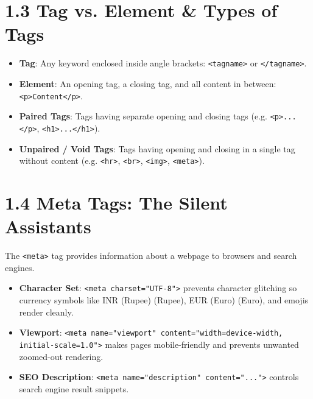 \section{1.3 Tag vs. Element \& Types of Tags}
\begin{itemize}[leftmargin=*]
    \item \textbf{Tag}: Any keyword enclosed inside angle brackets: \texttt{<tagname>} or \texttt{</tagname>}.
    \item \textbf{Element}: An opening tag, a closing tag, and all content in between: \texttt{<p>Content</p>}.
    \item \textbf{Paired Tags}: Tags having separate opening and closing tags (e.g. \texttt{<p>...</p>}, \texttt{<h1>...</h1>}).
    \item \textbf{Unpaired / Void Tags}: Tags having opening and closing in a single tag without content (e.g. \texttt{<hr>}, \texttt{<br>}, \texttt{<img>}, \texttt{<meta>}).
\end{itemize}

\section{1.4 Meta Tags: The Silent Assistants}
\begin{summarybox}
The \texttt{<meta>} tag provides information about a webpage to browsers and search engines.
\begin{itemize}[leftmargin=*]
    \item \textbf{Character Set}: \texttt{<meta charset="UTF-8">} prevents character glitching so currency symbols like INR (Rupee) (Rupee), EUR (Euro) (Euro), and emojis render cleanly.
    \item \textbf{Viewport}: \texttt{<meta name="viewport" content="width=device-width, initial-scale=1.0">} makes pages mobile-friendly and prevents unwanted zoomed-out rendering.
    \item \textbf{SEO Description}: \texttt{<meta name="description" content="...">} controls search engine result snippets.
\end{itemize}
\end{summarybox}

